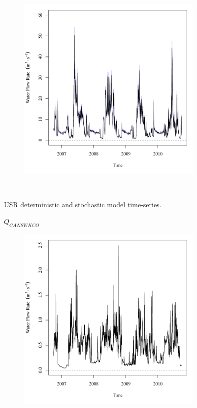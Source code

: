 \begin{linenumbers}
\begin{landscape}
\begin{figure}
\begin{subfigure}{0.7\textwidth}
			\includegraphics[width=\textwidth]{"Figures/Results_USR/Stochastic/Q U201"}
		\end{subfigure}\\
		\caption{USR deterministic and stochastic model time-series.}
	\end{figure}
\end{landscape}
\subfiguremid
\begin{landscape}
	\begin{figure}
		\centering
		$ Q_{CANSWKCO} $
		\begin{subfigure}{0.7\textwidth}
			\centering
			\includegraphics[width=\textwidth]{"Figures/Results_USR/Deterministic/Q CAN"}

\end{subfigure}
\end{figure}
\end{landscape}
\end{linenumbers}
